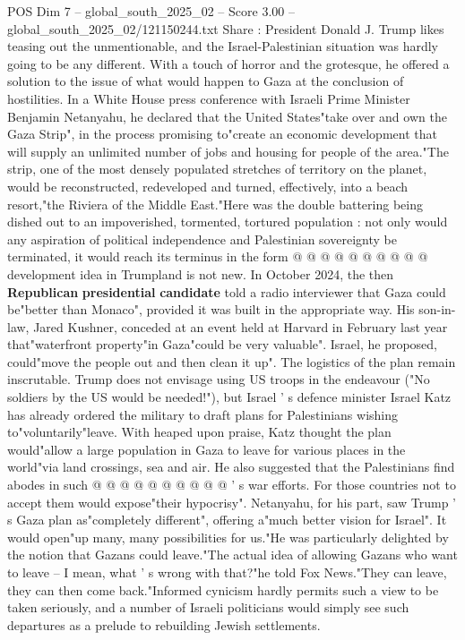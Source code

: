 \begin{textsample}{POS Dim 7 – global\_south\_2025\_02 – Score 3.00 – global\_south\_2025\_02/121150244.txt}  \label{ex:f7_pos_421}
Share : President Donald J.
Trump likes teasing out the unmentionable, and the Israel-Palestinian situation was hardly going to be any different.
With a touch of horror and the grotesque, he offered a solution to the issue of what would happen to Gaza at the conclusion of hostilities.
In a White House press conference with Israeli Prime Minister Benjamin Netanyahu, he declared that the United States"take over and own the Gaza Strip", in the process promising to"create an economic development that will supply an unlimited number of jobs and housing for people of the area."The strip, one of the most densely populated stretches of territory on the planet, would be reconstructed, redeveloped and turned, effectively, into a beach resort,"the Riviera of the Middle East."Here was the double battering being dished out to an impoverished, tormented, tortured population : not only would any aspiration of political independence and Palestinian sovereignty be terminated, it would reach its terminus in the form @ @ @ @ @ @ @ @ @ @ development idea in Trumpland is not new.
In October 2024, the then \textbf{Republican} \textbf{presidential} \textbf{candidate} told a radio interviewer that Gaza could be"better than Monaco", provided it was built in the appropriate way.
His son-in-law, Jared Kushner, conceded at an event held at Harvard in February last year that"waterfront property"in Gaza"could be very valuable".
Israel, he proposed, could"move the people out and then clean it up".
The logistics of the plan remain inscrutable.
Trump does not envisage using US troops in the endeavour ("No soldiers by the US would be needed!"), but Israel ' s defence minister Israel Katz has already ordered the military to draft plans for Palestinians wishing to"voluntarily"leave.
With heaped upon praise, Katz thought the plan would"allow a large population in Gaza to leave for various places in the world"via land crossings, sea and air.
He also suggested that the Palestinians find abodes in such @ @ @ @ @ @ @ @ @ @ ' s war efforts.
For those countries not to accept them would expose"their hypocrisy".
Netanyahu, for his part, saw Trump ' s Gaza plan as"completely different", offering a"much better vision for Israel".
It would open"up many, many possibilities for us."He was particularly delighted by the notion that Gazans could leave."The actual idea of allowing Gazans who want to leave -- I mean, what ' s wrong with that?"he told Fox News."They can leave, they can then come back."Informed cynicism hardly permits such a view to be taken seriously, and a number of Israeli politicians would simply see such departures as a prelude to rebuilding Jewish settlements.

\end{textsample}
